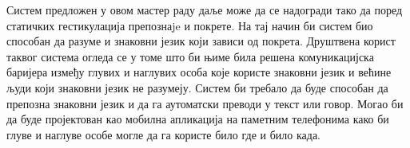 \documentclass[master]{finthesis}
\begin{document}
Систем предложен у овом мастер раду даље може да се надогради тако да поред статичких гестикулација препознаje и покрете. На тај начин би систем био способан да разуме и знаковни језик који зависи од покрета. Друштвена корист таквог система огледа се у томе што би њиме била решена комуникацијска баријера између глувих и наглувих особа које користе знаковни језик и већине људи који знаковни језик не разумеју. Систем би требало да буде способан да препозна знаковни језик и да га аутоматски преводи у текст или говор. Могао би да буде пројектован као мобилна апликација на паметним телефонима како би глуве и наглуве особе могле да га користе било где и било када.

\makebibliography
\end{document}
